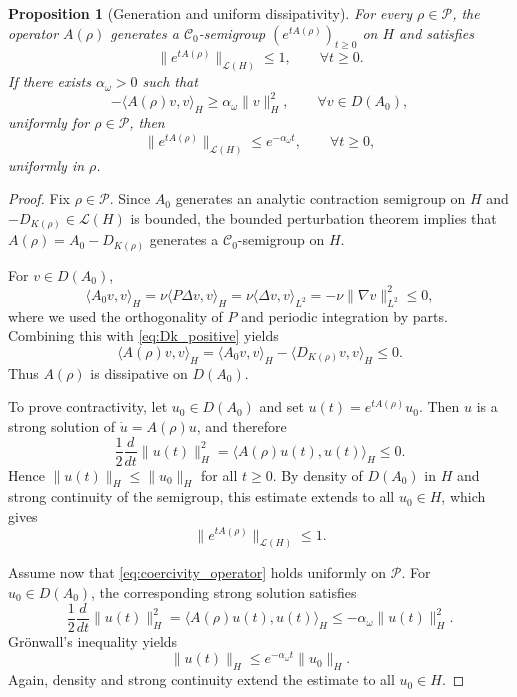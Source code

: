 \documentclass[preprint,12pt]{elsarticle}
\newtheorem{proposition}  [theorem]{Proposition}
\begin{document}
\begin{proposition}[Generation and uniform dissipativity]
\label{prop:gen_dissip}
For every $\rho\in\mathcal P$, the operator $A(\rho)$ generates a
$\mathcal C_0$-semigroup $(e^{tA(\rho)})_{t\ge0}$ on $H$ and satisfies
\[
\|e^{tA(\rho)}\|_{\mathcal L(H)}\le1,\qquad \forall t\ge0.
\]
If there exists $\alpha_\omega>0$ such that
\begin{equation}
\label{eq:coercivity_operator}
-\langle A(\rho)v,v\rangle_H \ge \alpha_\omega\|v\|_H^2,
\qquad \forall v\in D(A_0),
\end{equation}
uniformly for $\rho\in\mathcal P$, then
\[
\|e^{tA(\rho)}\|_{\mathcal L(H)}\le e^{-\alpha_\omega t},
\qquad \forall t\ge0,
\]
uniformly in $\rho$.
\end{proposition}

\begin{proof}
Fix $\rho\in\mathcal P$.
Since $A_0$ generates an analytic contraction semigroup on $H$ and
$-D_{K(\rho)}\in\mathcal L(H)$ is bounded, the bounded perturbation theorem
implies that $A(\rho)=A_0-D_{K(\rho)}$ generates a $\mathcal C_0$-semigroup on
$H$.

For $v\in D(A_0)$,
\[
\langle A_0v,v\rangle_H
=
\nu\langle P\Delta v,v\rangle_H
=
\nu\langle \Delta v,v\rangle_{L^2}
=
-\nu\|\nabla v\|_{L^2}^2
\le 0,
\]
where we used the orthogonality of $P$ and periodic integration by parts.
Combining this with \eqref{eq:Dk_positive} yields
\[
\langle A(\rho)v,v\rangle_H
=
\langle A_0v,v\rangle_H-\langle D_{K(\rho)}v,v\rangle_H
\le 0.
\]
Thus $A(\rho)$ is dissipative on $D(A_0)$.

To prove contractivity, let $u_0\in D(A_0)$ and set
$u(t)=e^{tA(\rho)}u_0$.
Then $u$ is a strong solution of $\dot u=A(\rho)u$, and therefore
\[
\frac12\frac{d}{dt}\|u(t)\|_H^2
=
\langle A(\rho)u(t),u(t)\rangle_H
\le 0.
\]
Hence $\|u(t)\|_H\le \|u_0\|_H$ for all $t\ge0$.
By density of $D(A_0)$ in $H$ and strong continuity of the semigroup, this
estimate extends to all $u_0\in H$, which gives
\[
\|e^{tA(\rho)}\|_{\mathcal L(H)}\le 1.
\]

Assume now that \eqref{eq:coercivity_operator} holds uniformly on $\mathcal P$.
For $u_0\in D(A_0)$, the corresponding strong solution satisfies
\[
\frac12\frac{d}{dt}\|u(t)\|_H^2
=
\langle A(\rho)u(t),u(t)\rangle_H
\le -\alpha_\omega\|u(t)\|_H^2.
\]
Gr\"onwall's inequality yields
\[
\|u(t)\|_H\le e^{-\alpha_\omega t}\|u_0\|_H.
\]
Again, density and strong continuity extend the estimate to all $u_0\in H$.
\end{proof}
\end{document}
